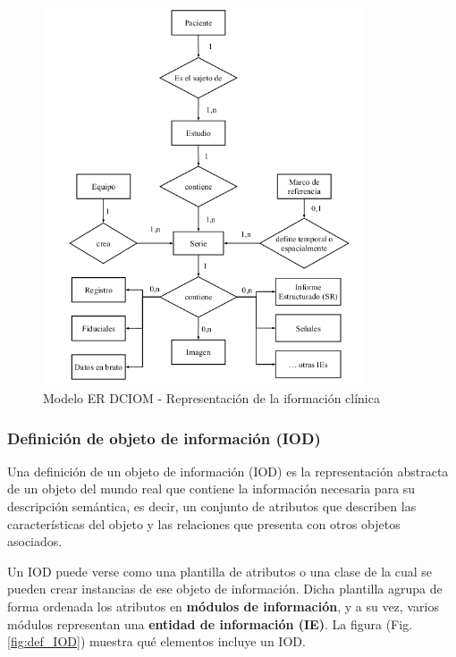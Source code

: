 \begin{figure}[!h]
\begin{center}
\includegraphics[width=0.85\textwidth]{images/ER_DICOM.png}
\caption{Modelo ER DCIOM - Representación de la iformación clínica}
\label{fig:ER_DICOM}
\end{center}
\end{figure}

\subsubsection{Definición de objeto de información (IOD)}
Una definición de un objeto de información (\acs{IOD}) es la representación abstracta de un objeto del mundo real que contiene la información necesaria para su descripción semántica, es decir, un conjunto de atributos que describen las características del objeto y las relaciones que presenta con otros objetos asociados.

Un \acs{IOD} puede verse como una plantilla de atributos o una clase de la cual se pueden crear instancias de ese objeto de información. Dicha plantilla agrupa de forma ordenada los atributos en \textbf{módulos de información}, y a su vez, varios módulos representan una \textbf{entidad de información (\acs{IE})}. La figura (Fig. \ref{fig:def_IOD}) muestra qué elementos incluye un \acs{IOD}.

